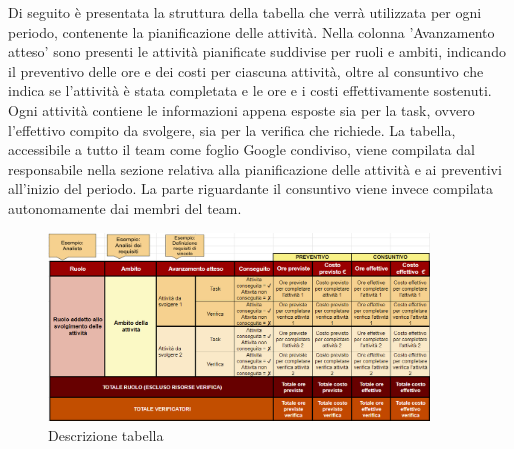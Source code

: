 Di seguito è presentata la struttura della tabella che verrà utilizzata per ogni periodo, contenente la pianificazione delle attività. Nella colonna 'Avanzamento atteso' sono presenti le attività pianificate suddivise per ruoli e ambiti, indicando il preventivo delle ore e dei costi per ciascuna attività, oltre al consuntivo che indica se l'attività è stata completata e le ore e i costi effettivamente sostenuti.
Ogni attività contiene le informazioni appena esposte sia per la task, ovvero l'effettivo compito da svolgere,  sia per la verifica che richiede.
La tabella, accessibile a tutto il team come foglio Google condiviso, viene compilata dal responsabile nella sezione relativa alla pianificazione delle attività e ai preventivi all'inizio del periodo. La parte riguardante il consuntivo viene invece compilata autonomamente dai membri del team.\begin{figure}[H]
    \centering
    \includegraphics[width=0.9\textwidth]{../Images/spiegazioneTabella.png}
    \caption{Descrizione tabella}
    \label{fig:spiegazioneTabella}
\end{figure}
